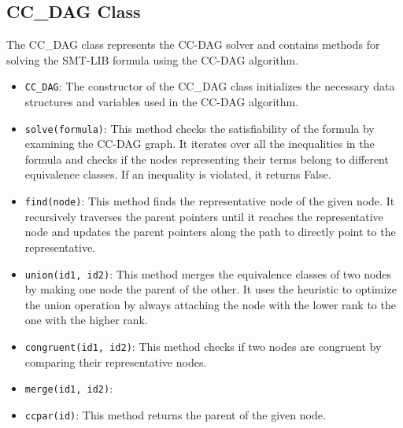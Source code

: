 \documentclass[11pt]{report}
\begin{document}
\subsection*{CC\_DAG Class}
The CC\_DAG class represents the CC-DAG solver and contains methods for solving the SMT-LIB formula using the CC-DAG algorithm.
\begin{itemize}
    \item \texttt{CC\_DAG}: The constructor of the CC\_DAG class initializes the necessary data structures and variables used in the CC-DAG algorithm.
    
    \item \texttt{solve(formula)}: This method checks the satisfiability of the formula by examining the CC-DAG graph. It iterates over all the inequalities in the formula and checks if the nodes representing their terms belong to different equivalence classes. If an inequality is violated, it returns False.
    
    \item \texttt{find(node)}: This method finds the representative node of the given node. It recursively traverses the parent pointers until it reaches the representative node and updates the parent pointers along the path to directly point to the representative.
    
    \item \texttt{union(id1, id2)}: This method merges the equivalence classes of two nodes by making one node the parent of the other. It uses the heuristic to optimize the union operation by always attaching the node with the lower rank to the one with the higher rank.
    \item \texttt{congruent(id1, id2)}: This method checks if two nodes are congruent by comparing their representative nodes.
    
    \item \texttt{merge(id1, id2)}: 
    
    \item \texttt{ccpar(id)}: This method returns the parent of the given node.

\end{itemize}
\end{document}
